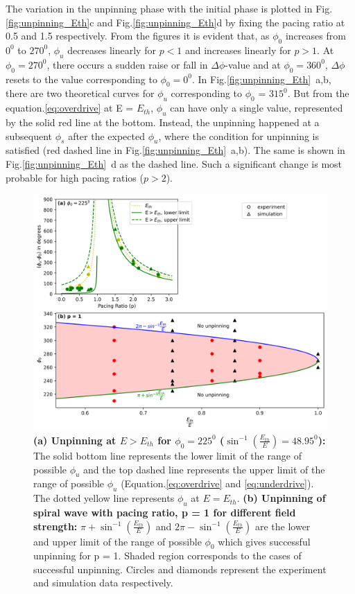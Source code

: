 \documentclass[%
 preprint,
 amsmath,amssymb,
 aps,
]{revtex4-2}
\begin{document}
The variation in the unpinning phase with the initial phase is plotted in Fig.\ref{fig:unpinning_Eth}c and Fig.\ref{fig:unpinning_Eth}d by fixing the pacing ratio at 0.5 and 1.5 respectively. From the figures it is evident that, as $\phi_0$ increases from $0^0$ to $270^0$, $\phi_{u}$ decreases linearly for $p<1$ and increases linearly for $p>1$. At $\phi_{0} = 270^0$, there occurs a sudden raise or fall in $\Delta\phi$-value and at $\phi_{0} = 360^0$, $\Delta\phi$ resets to the value corresponding to $\phi_{0} = 0^0$. In Fig.\ref{fig:unpinning_Eth}~a,b, there are two theoretical curves for $\phi_{u}$ corresponding to $\phi_{0}$ = $315^0$. But from the equation.\ref{eq:overdrive} at E = $E_{th}$, $\phi_{u}$ can have only a single value, represented by the solid red line at the bottom. Instead, the unpinning happened at a subsequent $\phi_{s}$ after the expected $\phi_{u}$, where the condition for unpinning is satisfied (red dashed line in Fig.\ref{fig:unpinning_Eth}~a,b). The same is shown in Fig.\ref{fig:unpinning_Eth}~d as the dashed line. Such a significant change is most probable for high pacing ratios ($p>2$). 


\begin{figure}[H]
    \centering
    \includegraphics[scale=0.7]{E.png}
    \caption{\textbf{(a) Unpinning at $E>E_{th}$ for ${\phi}_0 = 225^0$ (${\sin^{-1}}{(\frac{E_{th}}{E})}=48.95^0$):} The solid bottom line represents the lower limit of the range of possible ${\phi}_u$ and the top dashed line represents the upper limit of the range of possible ${\phi}_u$ (Equation.\ref{eq:overdrive} and \ref{eq:underdrive}). The dotted yellow line represents ${\phi}_u$ at $E=E_{th}$.
    \textbf{(b) Unpinning of spiral wave with pacing ratio, p = 1 for different field strength:} $\pi+{\sin^{-1}}{(\frac{E_{th}}{E})}$ and $2\pi-{\sin^{-1}}{(\frac{E_{th}}{E})}$ are the lower and upper limit of 
    the range of possible ${\phi}_0$ which gives successful unpinning for p = 1. Shaded region corresponds to the cases of successful unpinning.
    Circles and diamonds represent the experiment and simulation data respectively.}
    \label{fig:E_p1}
\end{figure}
\end{document}
